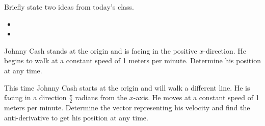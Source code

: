 \begin{problem}


\end{problem}


\postClass

\begin{problem}
\item Briefly state two ideas from today's class.
  \begin{itemize}
  \item
  \item
  \end{itemize}
\item
  \begin{subproblem}
    \item
  \end{subproblem}
\end{problem}



\begin{problem}
\item Johnny Cash stands at the origin and is facing in the positive $x$-direction.
  He begins to walk at a constant speed of 1 meters per minute. 
  Determine his position at any time.

  \vfill

\item This time Johnny Cash starts at the origin and will walk a different line.
  He is facing in a direction $\frac{\pi}{2}$ radians from the $x$-axis.
  He moves at a constant speed of 1 meters per minute. 
  Determine the vector representing his velocity and find the anti-derivative to get his position at any time.

  \vfill


\end{problem}


